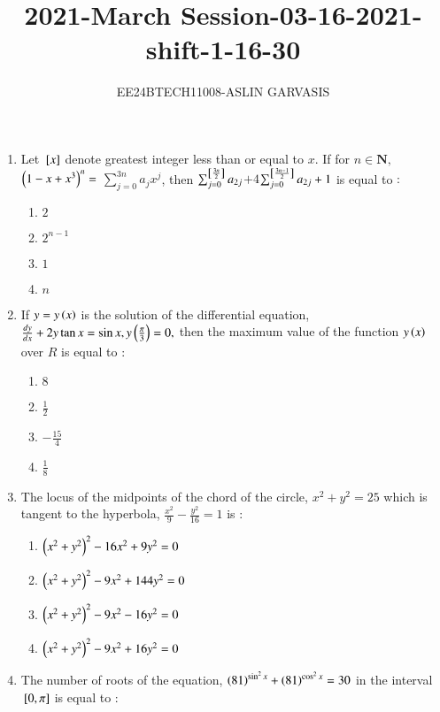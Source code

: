 \documentclass[journal,12pt,twocolumn]{IEEEtran}
\theoremstyle{remark}
\begin{document}

\vspace{3cm}
\title{2021-March Session-03-16-2021-shift-1-16-30}
\author{EE24BTECH11008-ASLIN GARVASIS}
\maketitle
\begin{enumerate}[start=16]
    \item Let ${}\left[x\right]$ denote greatest integer less than or equal to $x.$ If for $n \in \textbf{N},$ $\left(1-x+x^3\right)^n=$ $\sum_{j=0}^{3n}a_jx^j$, then $\sum_{j=0}^{{}\left[\frac{3n}{2}\right]}a_{2j}$$+4$$\sum_{j=0}^{{}\left[\frac{3n-1}{2}\right]}a_{2j}+1$ is equal to $:$\\
    \begin{enumerate}
        \item $2$
        \item $2^{n-1}$
        \item $1$
        \item $n$
    \end{enumerate}
    \item If $y=y\left(x\right)$ is the solution of the differential equation, $\frac{dy}{dx}+2y\tan x=\sin x,y\left(\frac{\pi}{3}\right)=0,$ then the maximum value of the function $y\left(x\right)$ over $R$ is equal to $:$\\
    \begin{enumerate}
        \item $8$
        \item $\frac{1}{2}$
        \item $-\frac{15}{4}$
        \item $\frac{1}{8}$
    \end{enumerate}
    \item The locus of the midpoints of the chord of the circle, $x^2+y^2=25$ which is tangent to the hyperbola, $\frac{x^2}{9}-\frac{y^2}{16}=1$ is $:$\\
    \begin{enumerate}
        \item $\left(x^2+y^2\right)^2-16x^2+9y^2=0$
        \item $\left(x^2+y^2\right)^2-9x^2+144y^2=0$
        \item $\left(x^2+y^2\right)^2-9x^2-16y^2=0$
        \item $\left(x^2+y^2\right)^2-9x^2+16y^2=0$
    \end{enumerate}
    \item The number of roots of the equation, $\left(81\right)^{\sin^2x} +\left(81\right)^{\cos^2x} =30$ in the interval ${}\left[0, \pi\right]$ is equal to $:$\\


\end{enumerate}
\end{document}

